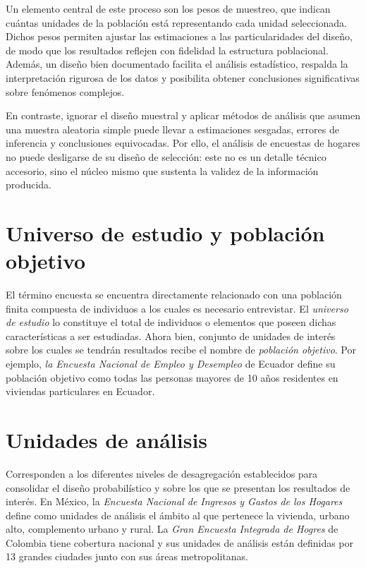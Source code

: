 \documentclass[
  spanish,
  12pt,
]{book}
\begin{document}
Un elemento central de este proceso son los pesos de muestreo, que indican cuántas unidades de la población está representando cada unidad seleccionada. Dichos pesos permiten ajustar las estimaciones a las particularidades del diseño, de modo que los resultados reflejen con fidelidad la estructura poblacional. Además, un diseño bien documentado facilita el análisis estadístico, respalda la interpretación rigurosa de los datos y posibilita obtener conclusiones significativas sobre fenómenos complejos.

En contraste, ignorar el diseño muestral y aplicar métodos de análisis que asumen una muestra aleatoria simple puede llevar a estimaciones sesgadas, errores de inferencia y conclusiones equivocadas. Por ello, el análisis de encuestas de hogares no puede desligarse de su diseño de selección: este no es un detalle técnico accesorio, sino el núcleo mismo que sustenta la validez de la información producida.

\section{Universo de estudio y población objetivo}\label{universo-de-estudio-y-poblaciuxf3n-objetivo}

El término encuesta se encuentra directamente relacionado con una población finita compuesta de individuos a los cuales es necesario entrevistar. El \emph{universo de estudio} lo constituye el total de individuos o elementos que poseen dichas características a ser estudiadas. Ahora bien, conjunto de unidades de interés sobre los cuales se tendrán resultados recibe el nombre de \emph{población objetivo}. Por ejemplo, \emph{la Encuesta Nacional de Empleo y Desempleo} de Ecuador define su población objetivo como todas las personas mayores de 10 años residentes en viviendas particulares en Ecuador.

\section{Unidades de análisis}\label{unidades-de-anuxe1lisis}

Corresponden a los diferentes niveles de desagregación establecidos para consolidar el diseño probabilístico y sobre los que se presentan los resultados de interés. En México, la \emph{Encuesta Nacional de Ingresos y Gastos de los Hogares} define como unidades de análisis el ámbito al que pertenece la vivienda, urbano alto, complemento urbano y rural. La \emph{Gran Encuesta Integrada de Hogres} de Colombia tiene cobertura nacional y sus unidades de análisis están definidas por 13 grandes ciudades junto con sus áreas metropolitanas.
\end{document}
